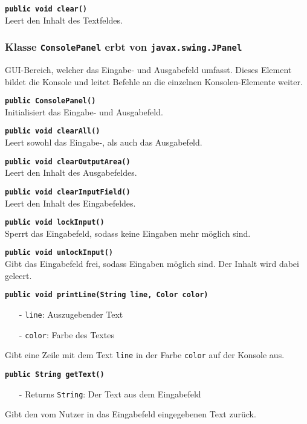 \documentclass[parskip=full,11pt,twoside]{scrartcl}
\begin{document}
\textbf{\texttt{public void clear()}}\\
Leert den Inhalt des Textfeldes.

\subsubsection{Klasse \texttt{ConsolePanel} erbt von \texttt{javax.swing.JPanel}}

GUI-Bereich, welcher das Eingabe- und Ausgabefeld umfasst. Dieses Element bildet die Konsole und leitet Befehle an die einzelnen Konsolen-Elemente weiter.

\textbf{\texttt{public ConsolePanel()}}\\
Initialisiert das Eingabe- und Ausgabefeld.

\textbf{\texttt{public void clearAll()}}\\
Leert sowohl das Eingabe-, als auch das Ausgabefeld.

\textbf{\texttt{public void clearOutputArea()}}\\
Leert den Inhalt des Ausgabefeldes.

\textbf{\texttt{public void clearInputField()}}\\
Leert den Inhalt des Eingabefeldes.

\textbf{\texttt{public void lockInput()}}\\
Sperrt das Eingabefeld, sodass keine Eingaben mehr möglich sind.

\textbf{\texttt{public void unlockInput()}}\\
Gibt das Eingabefeld frei, sodass Eingaben möglich sind. Der Inhalt wird dabei geleert.

\textbf{\texttt{public void printLine(String line, Color color)}}
\begin{itemize}[noitemsep]
	\item[-] \texttt{line}: Auszugebender Text
	\item[-] \texttt{color}: Farbe des Textes
\end{itemize}
Gibt eine Zeile mit dem Text \texttt{line} in der Farbe \texttt{color} auf der Konsole aus.

\textbf{\texttt{public String getText()}}
\begin{itemize}[noitemsep]
	\item[-] Returns \texttt{String}: Der Text aus dem Eingabefeld
\end{itemize}
Gibt den vom Nutzer in das Eingabefeld eingegebenen Text zurück.
\end{document}
